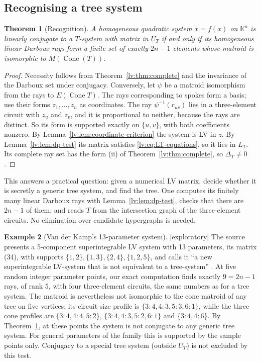 \documentclass[11pt,a4paper]{article}
\newtheorem{theorem}{Theorem}[section]
\theoremstyle{definition}
\newtheorem{example}[theorem]{Example}
\theoremstyle{remark}
\newcommand{\Cone}{\operatorname{Cone}}
\newcommand{\K}{\mathbb K}
\newcommand{\lab}[1]{\textsf{[#1]}}
\begin{document}
\subsection{Recognising a tree system}

\begin{theorem}[Recognition]
\label{lv:thm:recognition}
A homogeneous quadratic system $\dot x=f(x)$ on $\K^n$ is linearly conjugate to a $T$-system with matrix in $U_T$ if and only if its homogeneous linear Darboux rays form a finite set of exactly $2n-1$ elements whose matroid is isomorphic to $M(\Cone(T))$.
\end{theorem}

\begin{proof}
Necessity follows from Theorem~\ref{lv:thm:complete} and the invariance of the Darboux set under conjugacy. Conversely, let $\psi$ be a matroid isomorphism from the rays to $E(\Cone T)$. The rays corresponding to spokes form a basis; use their forms $z_1,\dots,z_n$ as coordinates. The ray $\psi^{-1}(r_{uv})$ lies in a three-element circuit with $z_u$ and $z_v$, and it is proportional to neither, because the rays are distinct. So its form is supported exactly on $\{u,v\}$, with both coefficients nonzero. By Lemma~\ref{lv:lem:coordinate-criterion} the system is LV in $z$. By Lemma~\ref{lv:lem:dp-test} its matrix satisfies \eqref{lv:eq:LT-equations}, so it lies in $L_T$. Its complete ray set has the form (ii) of Theorem~\ref{lv:thm:complete}, so $\Delta_T\neq0$.
\end{proof}

This answers a practical question: given a numerical LV matrix, decide whether it is secretly a generic tree system, and find the tree. One computes its finitely many linear Darboux rays with Lemma~\ref{lv:lem:dp-test}, checks that there are $2n-1$ of them, and reads $T$ from the intersection graph of the three-element circuits. No elimination over candidate hypergraphs is needed.

\begin{example}[Van der Kamp's 13-parameter system] \lab{exploratory}
The source presents a 5-component superintegrable LV system with 13 parameters, its matrix (34), with supports $\{1,2\},\{1,3\},\{2,4\},\{1,2,5\}$, and calls it ``a new superintegrable LV-system that is not equivalent to a tree-system'' \cite[\S4.4]{lv:K2025}. At five random integer parameter points, our exact computation finds exactly $9=2n-1$ rays, of rank $5$, with four three-element circuits, the same numbers as for a tree system. The matroid is nevertheless not isomorphic to the cone matroid of any tree on five vertices: its circuit-size profile is $\{3{:}4,4{:}3,5{:}3,6{:}1\}$, while the three cone profiles are $\{3{:}4,4{:}4,5{:}2\}$, $\{3{:}4,4{:}3,5{:}2,6{:}1\}$ and $\{3{:}4,4{:}6\}$. By Theorem~\ref{lv:thm:recognition}, at these points the system is not conjugate to any generic tree system. For general parameters of the family this is supported by the sample points only. Conjugacy to a special tree system (outside $U_T$) is not excluded by this test.
\end{example}
\end{document}
